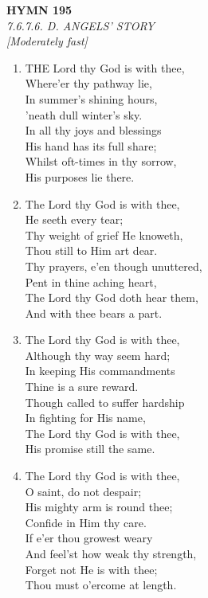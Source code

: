 \newpage
\begin{center}
    {\Large \textbf{HYMN 195}}
    \\
    \textit{7.6.7.6. D. ANGELS' STORY}
    \\
    \textit{\small [Moderately fast]}
\end{center}
\vspace{1em}

\begin{enumerate}
    \item THE Lord thy God is with thee, \\
        Where'er thy pathway lie, \\
        In summer's shining hours, \\
        'neath dull winter's sky. \\
        In all thy joys and blessings \\
        His hand has its full share; \\
        Whilst oft-times in thy sorrow, \\
        His purposes lie there.

    \item The Lord thy God is with thee, \\
        He seeth every tear; \\
        Thy weight of grief He knoweth, \\
        Thou still to Him art dear. \\
        Thy prayers, e'en though unuttered, \\
        Pent in thine aching heart, \\
        The Lord thy God doth hear them, \\
        And with thee bears a part.

    \item The Lord thy God is with thee, \\
        Although thy way seem hard; \\
        In keeping His commandments \\
        Thine is a sure reward. \\
        Though called to suffer hardship \\
        In fighting for His name, \\
        The Lord thy God is with thee, \\
        His promise still the same.

    \item The Lord thy God is with thee, \\
        O saint, do not despair; \\
        His mighty arm is round thee; \\
        Confide in Him thy care. \\
        If e'er thou growest weary \\
        And feel'st how weak thy strength, \\
        Forget not He is with thee; \\
        Thou must o'ercome at length.


\end{enumerate}
